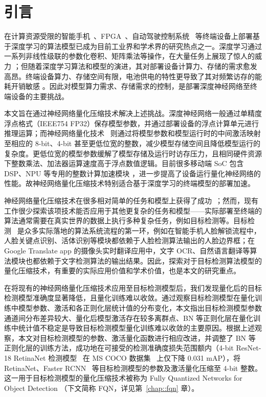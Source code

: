 \documentclass[
  fontset = mac,
]{shtthesis}
\begin{document}
\makeindices

\mainmatter
\chapter{引言} \label{chap:introduction}
在计算资源受限的智能手机~\citep{howard2019searching}、FPGA~\citep{zhang2019skynet}、自动驾驶控制系统~\citep{falcini2017deep} 等终端设备上部署基于深度学习的算法模型已成为目前工业界和学术界的研究热点之一。深度学习通过一系列非线性级联的参数化卷积、矩阵乘法等操作，在大量任务上展现了惊人的威力 \citep{lecun2015deep}；但随着深度学习算法和模型的演进，其对部署设备计算力、存储的需求愈发高昂。终端设备算力、存储空间有限，电池供电的特性更导致了其对频繁访存的能耗开销敏感 \citep{han2017efficient}。因此对模型算力需求、存储需求的控制，是部署深度神经网络至终端设备的主要挑战。

本文旨在通过神经网络量化压缩技术解决上述挑战。深度神经网络一般通过单精度浮点格式（IEEE754 FP32）保存模型参数，并通过部署设备的浮点计算单元进行推理运算；而神经网络量化技术~\citep{qin2020binary} 则通过将模型参数和模型运行时的中间激活映射至相应的 8-bit、4-bit 甚至更低位宽的整数，减少模型存储空间且降低模型运行的复杂度。更低位宽的模型参数缓解了模型存储及运行时访存压力，且相同硬件资源下整数乘法、加法器运算速度高于浮点数值逻辑。目前很多移动端 SoC 包含 DSP、NPU 等专用的整数计算加速模块 \citep{qualcomm2019snapdragon}，进一步提高了设备运行量化神经网络的性能。故神经网络量化压缩技术特别适合基于深度学习的终端模型的部署加速。

神经网络量化压缩技术在很多相对简单的任务和模型上获得了成功~\citep{zhou2016dorefanet, Zhang_2018, li2019additive}；然而，现有工作很少探索该项技术能否应用于其他更复杂的任务和模型——实际部署至终端的算法通常需要在真实世界的数据上执行多种复杂任务，例如目标检测等。目标检测~\citep{zou2019object} 是众多实际落地的算法系统流程的第一环，例如在智能手机人脸解锁流程中，人脸关键点识别、活体识别等模块都依赖于人脸检测算法输出的人脸边界框；在 Google Translate app 的摄像头实时翻译应用中，文字 OCR、自然语言翻译等算法模块也都依赖于文字检测算法的输出结果。因此，探索对于目标检测算法模型的量化压缩技术，有重要的实际应用价值和学术价值，也是本文的研究重点。

在将现有的神经网络量化压缩技术应用至目标检测模型后，我们发现量化后的目标检测模型准确度显著降低，且量化训练难以收敛。通过观察目标检测模型在量化训练中模型参数、激活和各正则化层统计值的分布变化，本文指出目标检测模型参数通道间分布差异较大、量化后模型激活存在较多离群点、BN 等正则化层在量化训练中统计值不稳定是导致目标检测模型量化训练难以收敛的主要原因。根据上述观察，本文对目标检测模型的参数、激活量化函数进行相应改进，并调整了 BN 等正则化层的训练方法，成功地在可接受的检测准确度损失范围额内（4-bit ResNet-18 RetinaNet 检测模型~\citep{He_2016, lin2017focal} 在 MS COCO 数据集~\citep{lin2014microsoft} 上仅下降 0.031 mAP），将 RetinaNet、Faster RCNN~\citep{ren2015faster} 等目标检测模型的参数及激活量化压缩至 4-bit 整数。这一用于目标检测模型的量化压缩技术被称为 Fully Quantized Networks for Object Detection （下文简称 FQN，详见第~\ref{chap::fqn} 章）。
\end{document}
